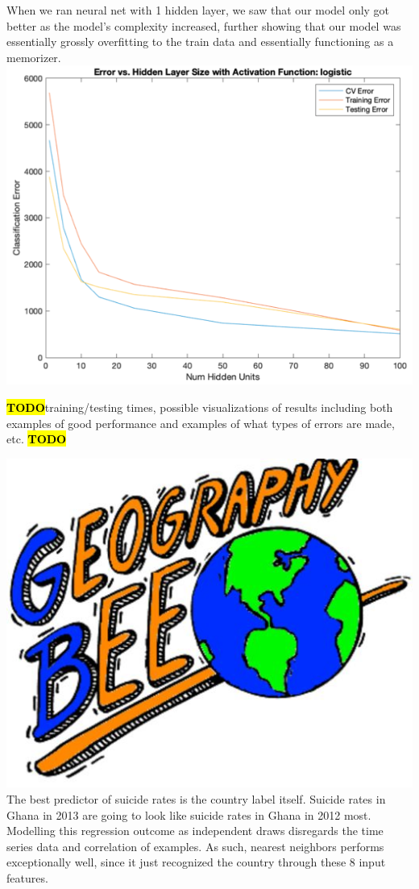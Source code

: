 \documentclass{article}
\newcommand{\TODO}{\textcolor{red}{\textbf{\hl{TODO}}}}
\begin{document}
\begin{multicols}{2}
When we ran neural net with 1 hidden layer, we saw that our model only got better as the model’s complexity increased, further showing that our model was essentially grossly overfitting to the train data and essentially functioning as a memorizer.
\includegraphics[width=\columnwidth]{neur-net.png}



\TODO training/testing times, possible visualizations of results including both examples of good
performance and examples of what types of errors are made, etc. \TODO

\includegraphics[width=\columnwidth]{geo-bee.jpg}
The best predictor of suicide rates is the country label itself. Suicide rates in Ghana in 2013 are going to look like suicide rates in Ghana in 2012 most. Modelling this regression outcome as independent draws disregards the time series data and correlation of examples. As such, nearest neighbors performs exceptionally well, since it just recognized the country through these 8 input features. 


\end{multicols}
\end{document}
